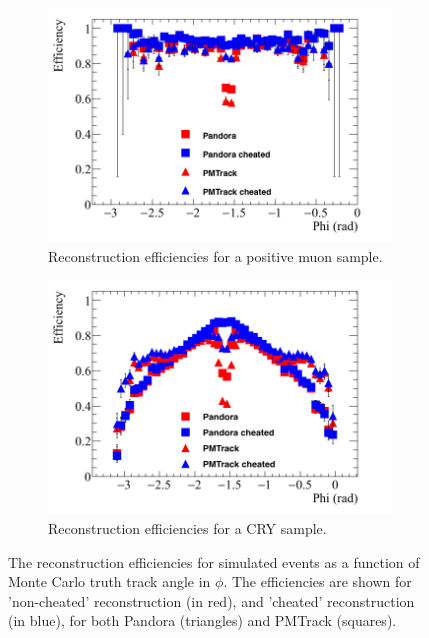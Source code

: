 \begin{figure}[h!]
  \centering
  \begin{subfigure}{0.48\textwidth}
    \centering
    \includegraphics[width=\textwidth]{Effic_AntiMuon_500V_All_Phi}
    \caption{Reconstruction efficiencies for a positive muon sample.}
    \label{fig:SimEffic_Phi_AMu}
  \end{subfigure}%
  \hspace{0.03\textwidth}%
  \begin{subfigure}{0.48\textwidth}
    \centering
    \includegraphics[width=\textwidth]{Effic_Cosmics_500V_All_Phi}
    \caption{Reconstruction efficiencies for a CRY sample.}
    \label{fig:SimEffic_Phi_CRY}
  \end{subfigure}
  \caption[The reconstruction efficiencies for simulated events as a function of Monte Carlo truth track angle in $\phi$.]
          {The reconstruction efficiencies for simulated events as a function of Monte Carlo truth track angle in $\phi$. The efficiencies are shown for 'non-cheated' reconstruction (in red), and 'cheated' reconstruction (in blue), for both Pandora (triangles) and PMTrack (squares).}
          \label{fig:SimEffic_Phi}
\end{figure}

